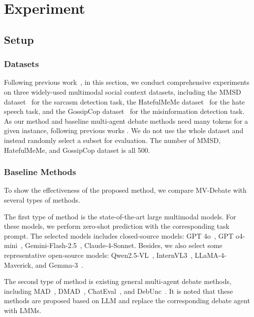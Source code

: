 \documentclass[letterpaper]{article} %
\begin{document}
\section{Experiment}
\label{sec:experiment}


\subsection{Setup}

\subsubsection{Datasets}
\label{subsec:datasets}
Following previous work~\cite{lin2024towards,liang2022multi}, in this section, we conduct comprehensive experiments on three widely-used multimodal social context datasets, including the MMSD dataset~\cite{benchekroun2022mmsd} for the sarcasm detection task, the HatefulMeMe dataset~\cite{kiela2020hateful} for the hate speech task, and the GossipCop dataset~\cite{shu2020fakenewsnet} for the misinformation detection task.  As our method and baseline multi-agent debate methods need many tokens for a given instance,  following previous works \cite{Du2023Debate,liu2025breaking}. We do not use the whole dataset and instead randomly select a subset for evaluation.  The number of MMSD, HatefulMeMe, and GossipCop dataset is all 500.




\subsubsection{Baseline Methods} To show the effectiveness of the proposed method, we compare MV-Debate with several types of methods.

The first type of method is the state-of-the-art large multimodal models. For these models, we perform zero-shot prediction with the corresponding task prompt. The selected models includes closed-source models: GPT 4o~\cite{hurst2024gpt}, GPT o4-mini~\cite{openai2025o4mini},  Gemini-Flash-2.5~\cite{comanici2025gemini},  
Claude-4-Sonnet. Besides, we also select some representative open-source models: Qwen2.5-VL~\cite{bai2025qwen2}, InternVL3~\cite{chen2024expanding}, LLaMA-4-Maverick, and Gemma-3~\cite{team2025gemma}.

The second type of method is existing general multi-agent debate methods, including  MAD~\cite{du2023improving}, DMAD~\cite{liu2025breaking},  ChatEval~\cite{chan2023chateval}, and DebUnc~\cite{yoffe2024debunc}. It is noted that these methods are proposed based on LLM and replace the corresponding debate agent with LMMs.
\end{document}
